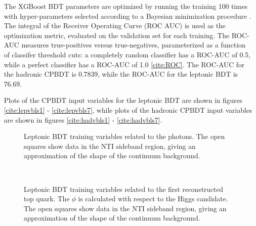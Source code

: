 The XGBoost BDT parameters are optimized by running the training 100 times with hyper-parameters selected according to a Bayesian minimization procedure \cite{skopt}. The integral of the Receiver Operating Curve (ROC AUC) is used as the optimization metric, evaluated on the validation set for each training. The ROC-AUC measures true-positives versus true-negatives, parameterized as a function of classifer threshold cuts: a completely random classifier has a ROC-AUC of 0.5, while a perfect classifier has a ROC-AUC of 1.0 \ref{cite:ROC}. The ROC-AUC for the hadronic CPBDT is 0.7839, while the ROC-AUC for the leptonic BDT is 76.69.

Plots of the CPBDT input variables for the leptonic BDT are shown in figures \ref{cite:lepvbls1} -  \ref{cite:lepvbls7}, while plots of the hadronic CPBDT input variables are shown in figures \ref{cite:hadvbls1} -  \ref{cite:hadvbls7}.

\begin{figure}[htbp]
  \centering
  \caption{Leptonic BDT training variables related to the photons. The open squares show data in the NTI sideband region, giving an approximation of the shape of the continuum background. }
  \label{fig:lepvbls1}
\end{figure}

\begin{figure}[htbp]
  \centering
	 \\
  \caption{Leptonic BDT training variables related to the first reconstructed top quark. The $\phi$ is calculated with respect to the Higgs candidate.  The open squares show data in the NTI sideband region, giving an approximation of the shape of the continuum background. }
  \label{fig:lepvbls2}
\end{figure}

